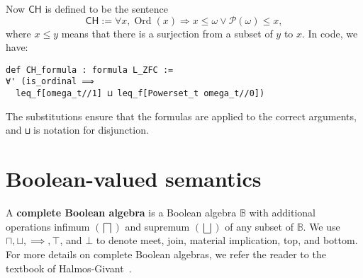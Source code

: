 \documentclass[sigplan,10pt,review]{acmart}
\newcommand{\B}{\mathbb{B}}
\newcommand{\lil}{\lstinline}
\newcommand{\ZFC}{\mathsf{ZFC}}
\newcommand{\CH}{\mathsf{CH}}
\theoremstyle{definition}
\DeclareMathOperator{\Ord}{Ord}
\begin{document}




Now \(\CH\) is defined to be the sentence
\[\CH:=\forall x, \Ord(x) \Rightarrow x \le \omega \vee \mathcal{P}(\omega) \le x,\]
where \(x \le y\) means that there is a surjection from a subset of \(y\) to \(x\). In code, we have:
\begin{lstlisting}
def CH_formula : formula L_ZFC :=
∀' (is_ordinal ⟹
  leq_f[omega_t//1] ⊔ leq_f[Powerset_t omega_t//0])
\end{lstlisting}
The substitutions ensure that the formulas are applied to the correct arguments, and \lil{⊔} is notation for disjunction.

\section{Boolean-valued semantics}
\label{sect:boolean-semantics}
A \textbf{complete Boolean algebra} is a Boolean algebra $\B$ with additional operations infimum $(\bigsqcap)$ and supremum $(\bigsqcup)$ of any subset of $\B$.
We use $\sqcap, \sqcup, \implies, \top$, and $\bot$ to denote meet, join, material implication, top, and bottom. For more details on complete Boolean algebras, we refer the reader to the textbook of Halmos-Givant~\cite{givant2008introduction}.
\end{document}
